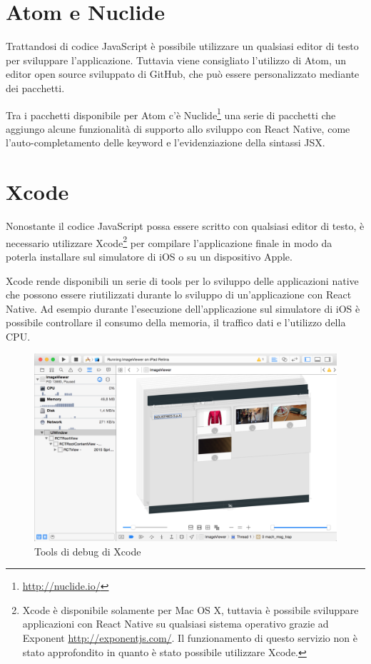 \section{Atom e Nuclide}

Trattandosi di codice JavaScript è possibile utilizzare un qualsiasi editor di testo per sviluppare l'applicazione.
Tuttavia viene consigliato l'utilizzo di Atom, un editor open source sviluppato di GitHub, che può essere personalizzato mediante dei pacchetti.

Tra i pacchetti disponibile per Atom c'è Nuclide\footnote{\url{http://nuclide.io/}} una serie di pacchetti che aggiungo alcune funzionalità di supporto allo sviluppo con React Native, come l'auto-completamento delle keyword e l'evidenziazione della sintassi JSX.

\section{Xcode}

Nonostante il codice JavaScript possa essere scritto con qualsiasi editor di testo, è necessario utilizzare Xcode\footnote{Xcode è disponibile solamente per Mac OS X, tuttavia è possibile sviluppare applicazioni con React Native su qualsiasi sistema operativo grazie ad Exponent \url{http://exponentjs.com/}. Il funzionamento di questo servizio non è stato approfondito in quanto è stato possibile utilizzare Xcode.} per compilare l'applicazione finale in modo da poterla installare sul simulatore di iOS o su un dispositivo Apple.

Xcode rende disponibili un serie di tools per lo sviluppo delle applicazioni native che possono essere riutilizzati durante lo sviluppo di un'applicazione con React Native. Ad esempio durante l'esecuzione dell'applicazione sul simulatore di iOS è possibile controllare il consumo della memoria, il traffico dati e l'utilizzo della CPU.

\begin{figure}[htp]
\centering
\includegraphics[width=\textwidth]{../immagini/xcode-tools}
\caption{Tools di debug di Xcode}  
\end{figure}
\FloatBarrier

